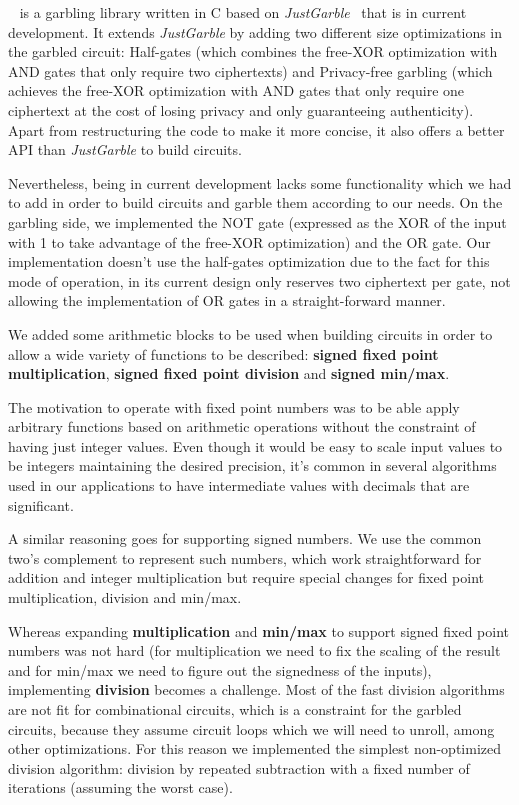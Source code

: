 \libgarble{}~\cite{libgarble} is a garbling library written in C based on
\emph{JustGarble}~\cite{justgarble} that is in current development.  It extends
\emph{JustGarble} by adding two different size optimizations in the garbled
circuit: Half-gates (which combines the free-XOR optimization with AND gates
that only require two ciphertexts) and Privacy-free garbling (which achieves
the free-XOR optimization with AND gates that only require one ciphertext at
the cost of losing privacy and only guaranteeing authenticity).  Apart from
restructuring the code to make it more concise, it also offers a better API
than \emph{JustGarble} to build circuits.

Nevertheless, \libgarble{} being in current development lacks some
functionality which we had to add in order to build circuits and garble them
according to our needs.  On the garbling side, we implemented the NOT gate
(expressed as the XOR of the input with 1 to take advantage of the free-XOR
optimization) and the OR gate.  Our implementation doesn't use the half-gates
optimization due to the fact for this mode of operation, \libgarble{} in its
current design only reserves two ciphertext per gate, not allowing the
implementation of OR gates in a straight-forward manner.

We added some arithmetic blocks to be used when building circuits in order to
allow a wide variety of functions to be described: \textbf{signed fixed point
multiplication}, \textbf{signed fixed point division} and \textbf{signed
min/max}.

The motivation to operate with fixed point numbers was to be able apply
arbitrary functions based on arithmetic operations without the constraint of
having just integer values.  Even though it would be easy to scale input values
to be integers maintaining the desired precision, it's common in several
algorithms used in our applications to have intermediate values with decimals
that are significant.

A similar reasoning goes for supporting signed numbers.  We use the common
two's complement to represent such numbers, which work straightforward for
addition and integer multiplication but require special changes for fixed point
multiplication, division and min/max.

Whereas expanding \textbf{multiplication} and \textbf{min/max} to support
signed fixed point numbers was not hard (for multiplication we need to fix the
scaling of the result and for min/max we need to figure out the signedness of
the inputs), implementing \textbf{division} becomes a challenge.  Most of the
fast division algorithms are not fit for combinational circuits, which is a
constraint for the garbled circuits, because they assume circuit loops which we
will need to unroll, among other optimizations.  For this reason we implemented
the simplest non-optimized division algorithm: division by repeated subtraction
with a fixed number of iterations (assuming the worst case).

